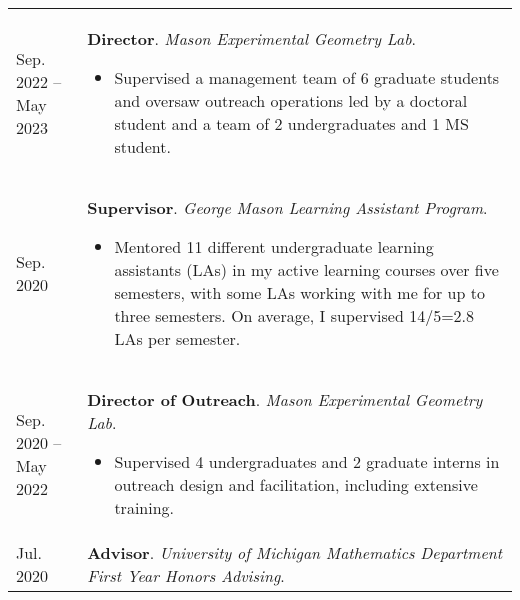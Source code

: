     \begin{center}
    {
    \renewcommand{\arraystretch}{1.5}
    \begin{longtable}{p{}  p{}}
     Sep.  2022 --  May  2023 & \textbf{Director}. \textit{Mason Experimental Geometry Lab}. 
        \hspace{-1em}

        {\small
        \begin{itemize}
        \setlength{\parindent}{0em}
        \item[] Supervised a management team of 6 graduate students and oversaw outreach operations led by a doctoral student and a team of 2 undergraduates and 1 MS student.
        \end{itemize}
        }
        \vspace{-1em}
         \\ 
 Sep.  2020 & \textbf{Supervisor}. \textit{George Mason Learning Assistant Program}. 
        \hspace{-1em}

        {\small
        \begin{itemize}
        \setlength{\parindent}{0em}
        \item[] Mentored 11 different undergraduate learning assistants (LAs) in my active learning courses over five semesters, with some LAs working with me for up to three semesters. On average, I supervised 14/5=2.8 LAs per semester.
        \end{itemize}
        }
        \vspace{-1em}
         \\ 
 Sep.  2020 --  May  2022 & \textbf{Director of Outreach}. \textit{Mason Experimental Geometry Lab}. 
        \hspace{-1em}

        {\small
        \begin{itemize}
        \setlength{\parindent}{0em}
        \item[] Supervised 4 undergraduates and 2 graduate interns in outreach design and facilitation, including extensive training.
        \end{itemize}
        }
        \vspace{-1em}
         \\ 
 Jul.  2020 & \textbf{Advisor}. \textit{University of Michigan Mathematics Department First Year Honors Advising}.  
    \end{longtable}
    } 
    \end{center}

    \vspace{-1em}
    